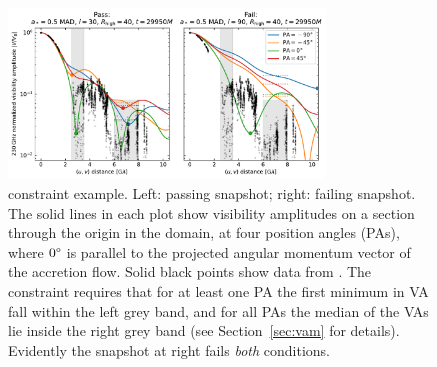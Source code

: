 \begin{figure}
  \centering
  \includegraphics[width=0.75\textwidth]{figures/passfail_va.pdf}
  \caption{\vam constraint example.  Left: passing snapshot; right: failing snapshot.  The solid lines in each plot show visibility amplitudes on a section through the origin in the \uv domain, at four position angles (PAs), where $0\degree$ is parallel to the projected angular momentum vector of the accretion flow.
  Solid black points show data from \aprilvii.  The \vam constraint requires that for at least one PA the first minimum in VA fall within the left grey band, and for all PAs the median of the VAs lie inside the right grey band (see Section~\ref{sec:vam} for details).  Evidently the snapshot at right fails {\em both} conditions.
  }
  \label{fig:passfail_va}
\end{figure}

